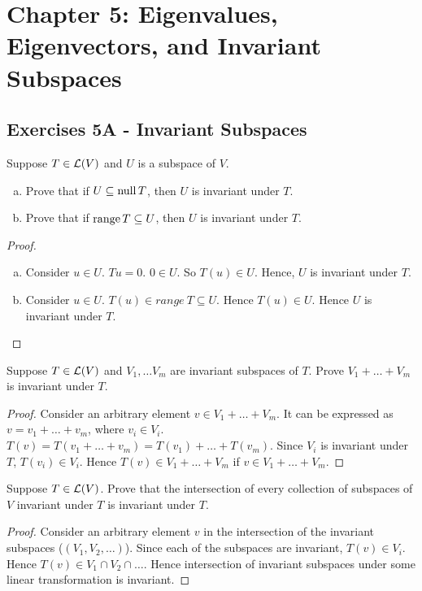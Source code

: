 \section*{Chapter 5: Eigenvalues, Eigenvectors, and Invariant Subspaces}

\subsection*{Exercises 5A - Invariant Subspaces}

\begin{problem}{1}
Suppose $T\in\mathcal{L}(V)$ and $U$ is a subspace of $V$.
\begin{enumerate}[(a)]
\item Prove that if $U\subseteq \operatorname{null} T$, then $U$ is invariant under $T$.
\item Prove that if $\operatorname{range} T\subseteq U$, then $U$ is invariant under $T$.
\end{enumerate}
\end{problem}
\begin{proof}

\begin{enumerate}[(a)]
\item Consider $u \in U$. $Tu = 0$. $0 \in U$. So $T(u) \in U$. Hence, $U$ is invariant under $T$.
\item Consider $u \in U$. $T(u) \in range\ T \subseteq U$. Hence $T(u) \in U$. Hence $U$ is invariant under $T$.  \qedhere
\end{enumerate}
\end{proof}

\begin{problem}{2}
Suppose $T\in\mathcal{L}(V)$ and $V_1, \ldots V_m$ are invariant subspaces of $T$. Prove $V_1 + \ldots + V_m$ is invariant under $T$.
\end{problem}
\begin{proof}
Consider an arbitrary element $v \in V_1 + \ldots + V_m$. It can be expressed as $v = v_1 + \ldots + v_m$, where $v_i \in V_i$.
$T(v) = T(v_1 + \ldots + v_m) = T(v_1) + \ldots + T(v_m)$. Since $V_i$ is invariant under $T$, $T(v_i) \in V_i$. 
Hence $T(v) \in V_1 + \ldots + V_m$ if $v \in V_1 + \ldots + V_m$.
\end{proof}

\begin{problem}{3}
Suppose $T\in\mathcal{L}(V)$. Prove that the intersection of every collection of subspaces of $V$ invariant under $T$ is invariant 
under $T$.
\end{problem}
\begin{proof}
Consider an arbitrary element $v$ in the intersection of the invariant subspaces ($(V_1, V_2, \ldots)$). Since each of the 
subspaces are invariant, $T(v) \in V_i$. Hence $T(v) \in V_1 \cap V_2 \cap \ldots$. Hence intersection of invariant subspaces
under some linear transformation is invariant.
\end{proof}
